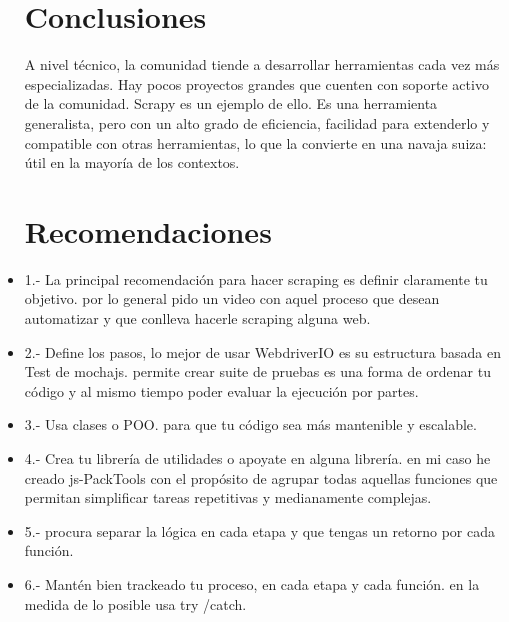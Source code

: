 \documentclass[twoside,twocolumn]{article}
\begin{document}
\begin{itemize}
\clearpage


\clearpage



\section{Conclusiones}
A nivel técnico, la comunidad tiende a desarrollar herramientas cada vez más especializadas. Hay pocos proyectos grandes que cuenten con soporte activo de la comunidad. Scrapy es un ejemplo de ello. Es una herramienta generalista, pero con un alto grado de eficiencia, facilidad para extenderlo y compatible con otras herramientas, lo que la convierte en una navaja suiza: útil en la mayoría de los contextos.

\section{Recomendaciones}

\item 1.- La principal recomendación para hacer scraping es definir claramente tu objetivo. por lo general pido un video con aquel proceso que desean automatizar y que conlleva hacerle scraping alguna web. 
\newline

\item  2.- Define los pasos, lo mejor de usar WebdriverIO es su estructura basada en Test de mochajs. permite crear suite de pruebas es una forma de ordenar tu código y al mismo tiempo poder evaluar la ejecución por partes.
\newline

\item 3.- Usa clases o POO. para que tu código sea más mantenible y escalable.
\newline

\item 4.- Crea tu librería de utilidades o apoyate en alguna librería. en mi caso he creado js-PackTools con el propósito de agrupar todas aquellas funciones que permitan simplificar tareas repetitivas y medianamente complejas.
\newline

\item 5.- procura separar la lógica en cada etapa y que tengas un retorno por cada función.
\newline

\item 6.- Mantén bien trackeado tu proceso, en cada etapa y cada función. en la medida de lo posible usa try /catch.
\newline


\end{itemize}
\end{document}
